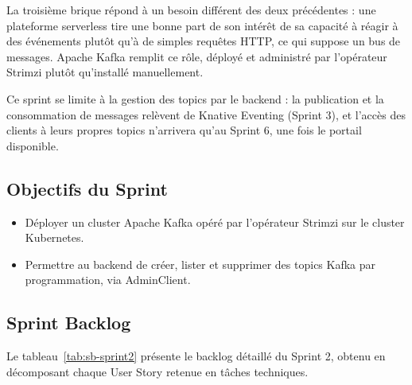 La troisième brique répond à un besoin différent des deux précédentes : une plateforme serverless tire une bonne part de son intérêt de sa capacité à réagir à des événements plutôt qu'à de simples requêtes HTTP, ce qui suppose un bus de messages. Apache Kafka remplit ce rôle, déployé et administré par l'opérateur Strimzi plutôt qu'installé manuellement.

Ce sprint se limite à la gestion des topics par le backend : la publication et la consommation de messages relèvent de Knative Eventing (Sprint 3), et l'accès des clients à leurs propres topics n'arrivera qu'au Sprint 6, une fois le portail disponible.

\subsection{Objectifs du Sprint}

\begin{itemize}
    \item Déployer un cluster Apache Kafka opéré par l'opérateur Strimzi sur le cluster Kubernetes.
    \item Permettre au backend de créer, lister et supprimer des topics Kafka par programmation, via AdminClient.
\end{itemize}
\subsection{Sprint Backlog}
Le tableau~\ref{tab:sb-sprint2} présente le backlog détaillé du Sprint 2, obtenu en décomposant chaque User Story retenue en tâches techniques.

